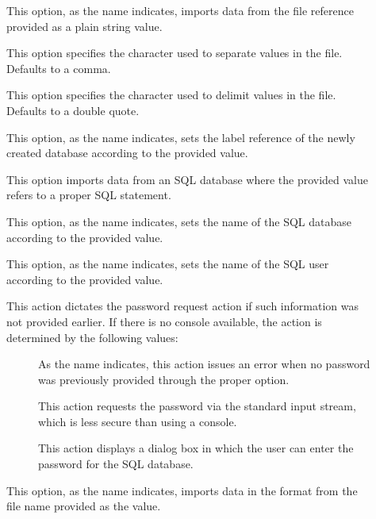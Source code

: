 \begin{description}
\begin{description}
\item[] This option, as the name indicates, imports data from the  file reference provided as a plain string value.

\item[] This option specifies the character used to separate values in the  file. Defaults to a comma.

\item[] This option specifies the character used to delimit values in the  file. Defaults to a double quote.

\item[] This option, as the name indicates, sets the label reference of the newly created database according to the provided value.

\item[] This option imports data from an \gls{SQL} database where the provided value refers to a proper  \gls{SQL} statement.

\item[] This option, as the name indicates, sets the name of the \gls{SQL} database according to the provided value.

\item[] This option, as the name indicates, sets the name of the \gls{SQL} user according to the provided value.

\item[] This action dictates the password request action if such information was not provided earlier. If there is no console available, the action is determined by the following values:

\begin{description}
\item[] As the name indicates, this action issues an error when no password was previously provided through the proper option.

\item[] This action requests the password via the standard input stream, which is less secure than using a console.

\item[] This action displays a dialog box in which the user can enter the password for the \gls{SQL} database.
\end{description}

\item[] This option, as the name indicates, imports data in the  format from the file name provided as the value.


\end{description}
\end{description}

